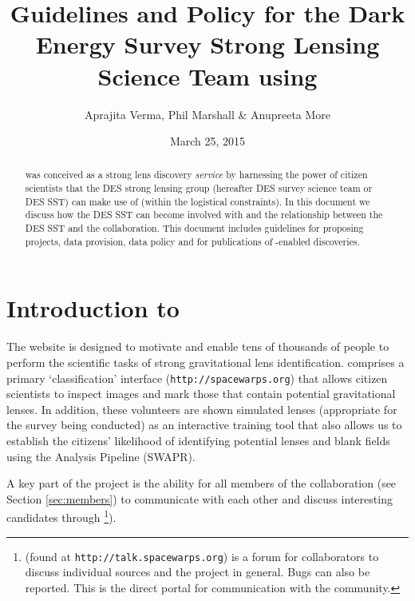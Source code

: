 \documentclass[a4paper,twocolumn]{article}
\begin{document}
             
\title{Guidelines and Policy for the Dark Energy Survey Strong Lensing Science Team using \SW}
\author{Aprajita Verma, Phil Marshall \& Anupreeta More}
\date{March 25, 2015}
\maketitle


\begin{abstract} 
\noindent \SW was conceived as a strong lens
discovery {\it service} by harnessing the power of citizen scientists that the DES strong lensing group (hereafter DES survey science team or DES SST) can make use of
(within the logistical constraints). In this document we discuss how the DES SST can become involved with \SW and the relationship
between the DES SST and the \SW collaboration. 
This document includes guidelines for proposing projects, data provision, data policy and for publications of \SW-enabled discoveries.
\end{abstract}

\setcounter{footnote}{0}


\section{Introduction to \sw}

The \SW website is designed to motivate and  enable tens of thousands of
people to perform the scientific tasks of strong gravitational lens
identification.  \SW comprises a primary `classification' interface (\texttt{http://spacewarps.org}) that allows citizen scientists to inspect images and mark those that contain potential gravitational lenses. In addition, these volunteers are shown simulated lenses (appropriate for the survey being conducted) as an interactive training tool that also allows us to establish the citizens' likelihood of identifying potential lenses and blank fields using the \SW Analysis Pipeline (SWAPR). 

A key part of the \SW project is the ability for all members of the \SW collaboration (see Section \ref{sec:members}) to communicate with each other and discuss interesting candidates through \Talk\footnote{\Talk (found at \texttt{http://talk.spacewarps.org}) is a forum for \SW collaborators to discuss individual sources and the \SW project in general. Bugs can also be reported. This is the direct portal for communication with the \SW community.}).
\end{document}

